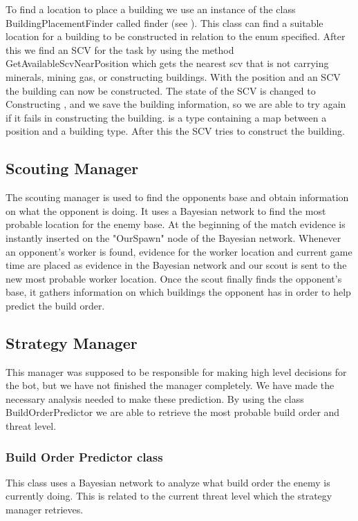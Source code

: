 			To find a location to place a building we use an instance of the class BuildingPlacementFinder called finder (see ).
			This class can find a suitable location for a building to be constructed in relation to the enum specified. After this we find an SCV for the 
			task  by using the method GetAvailableScvNearPosition which gets the nearest scv that is not carrying minerals, mining gas, or 
			constructing buildings. With the position and an SCV the building can now be constructed. The state of the SCV is changed to Constructing , and 
			we save the building information, so we are able to try again if it fails in constructing the building.  is a type containing 
			a map between a position and a building type. After this the SCV tries to 
			construct the building.
	\subsection{Scouting Manager}
		The scouting manager is used to find the opponents base and obtain information on what the opponent is doing. 
		It uses a Bayesian network to find the most probable location for the enemy base.
		At the beginning of the match evidence is instantly inserted on the "OurSpawn" node of the Bayesian network.
		Whenever an opponent's worker is found, evidence for the worker location and current game time are placed as evidence in the 
		Bayesian network and our scout is sent to the new most probable worker location. 
		Once the scout finally finds the opponent's base, it gathers information on which 
		buildings the opponent has in order to help predict the build order.
	\subsection{Strategy Manager}
		This manager was supposed to be responsible for making high level decisions for the bot, but we have not finished the manager completely. We have made the necessary analysis needed to make these prediction. By using the class BuildOrderPredictor we are able to retrieve the most 
		probable build order and threat level.
		
		\subsubsection{Build Order Predictor class}
			This class uses a Bayesian network to analyze what build order the enemy is currently doing. This is related to the current threat level which
			the strategy manager retrieves. \\
			
